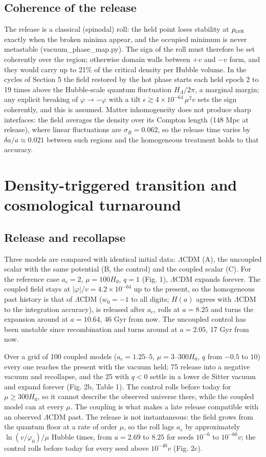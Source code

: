 \documentclass[11pt,a4paper]{article}
\begin{document}
\subsection{Coherence of the release}
The release is a classical (spinodal) roll: the held point loses stability at $\rho_{\rm crit}$ exactly when the broken minima appear, and the occupied minimum is never metastable (vacuum\_phase\_map.py). The sign of the roll must therefore be set coherently over the region; otherwise domain walls between $+v$ and $-v$ form, and they would carry up to 21\% of the critical density per Hubble volume. In the cycles of Section 5 the field restored by the hot phase starts each held epoch 2 to 19 times above the Hubble-scale quantum fluctuation $H_\Lambda/2\pi$, a marginal margin; any explicit breaking of $\varphi\to-\varphi$ with a tilt $\epsilon\gtrsim4\times10^{-64}\,\mu^2v$ sets the sign coherently, and this is assumed. Matter inhomogeneity does not produce sharp interfaces: the field averages the density over its Compton length (148 Mpc at release), where linear fluctuations are $\sigma_R=0.062$, so the release time varies by $\delta a/a\approx0.021$ between such regions and the homogeneous treatment holds to that accuracy.

\section{Density-triggered transition and cosmological turnaround}
\subsection{Release and recollapse}
Three models are compared with identical initial data: $\Lambda$CDM (A), the uncoupled scalar with the same potential (B, the control) and the coupled scalar (C). For the reference case $a_c=2$, $\mu=100H_0$, $q=1$ (Fig. 1), $\Lambda$CDM expands forever. The coupled field stays at $|\varphi|/v=4.2\times10^{-64}$ up to the present, so the homogeneous past history is that of $\Lambda$CDM ($w_0=-1$ to all digits; $H(a)$ agrees with $\Lambda$CDM to the integration accuracy), is released after $a_c$, rolls at $a=8.25$ and turns the expansion around at $a=10.64$, 46 Gyr from now. The uncoupled control has been unstable since recombination and turns around at $a=2.05$, 17 Gyr from now.

Over a grid of 100 coupled models ($a_c=1.25$--$5$, $\mu=3$--$300H_0$, $q$ from $-0.5$ to $10$) every one reaches the present with the vacuum held; 75 release into a negative vacuum and recollapse, and the 25 with $q<0$ settle in a lower de Sitter vacuum and expand forever (Fig. 2b, Table 1). The control rolls before today for $\mu\ge300H_0$, so it cannot describe the observed universe there, while the coupled model can at every $\mu$. The coupling is what makes a late release compatible with an observed $\Lambda$CDM past. The release is not instantaneous: the field grows from the quantum floor at a rate of order $\mu$, so the roll lags $a_c$ by approximately $\ln(v/\varphi_0)/\mu$ Hubble times, from $a=2.69$ to $8.25$ for seeds $10^{-6}$ to $10^{-60}v$; the control rolls before today for every seed above $10^{-40}v$ (Fig. 2c).
\end{document}
